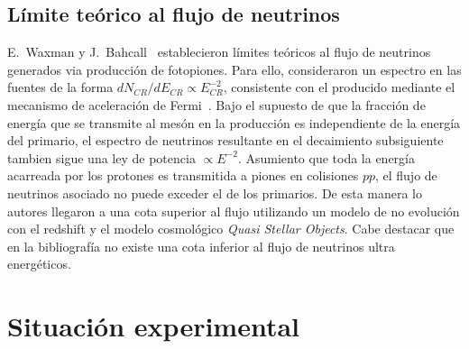 	\subsection{L\'imite te\'orico al flujo de neutrinos}
	
	E.\ Waxman y J.\ Bahcall~\cite{cite:WaxmanBahcall1} establecieron l\'imites te\'oricos al flujo de neutrinos generados via producci\'on de fotopiones.
	Para ello, consideraron un espectro en las fuentes de la forma $dN_{CR}/dE_{CR}\propto E_{CR}^{-2}$, consistente con el producido mediante el mecanismo de aceleraci\'on de Fermi~\cite{cite:Waxman1}.
	Bajo el supuesto de que la fracci\'on de energ\'ia que se transmite al mes\'on en la producci\'on es independiente de la energ\'ia del primario, el espectro de neutrinos resultante en el decaimiento subsiguiente tambien sigue una ley de potencia $\propto E^{-2}$.
	Asumiento que toda la energ\'ia acarreada por los protones es transmitida a piones en colisiones $pp$, el flujo de neutrinos asociado no puede exceder el de los primarios.
	De esta manera lo autores llegaron a una cota superior al flujo utilizando un modelo de no evoluci\'on con el redshift y el modelo cosmol\'ogico \emph{Quasi Stellar Objects}.
	Cabe destacar que en la bibliograf\'ia no existe una cota inferior al flujo de neutrinos ultra energ\'eticos.
	
% 	
% 	
% 	

\section{Situación experimental}

